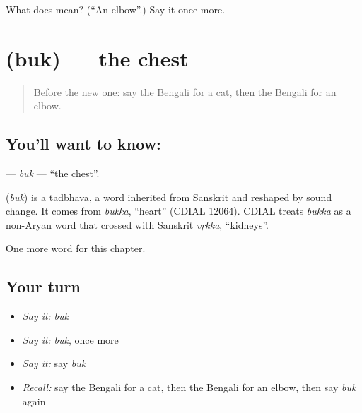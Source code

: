 \begin{tcolorbox}[breakable,colback=teal!4,colframe=teal!35!black,title={Before you move on}]
What does  mean? (\textquotedblleft{}An elbow\textquotedblright{}.) Say it once more.
\end{tcolorbox}
\section[\texorpdfstring{\bn{বুক} (buk)}{বুক (buk)}]{ (buk) — the chest}

\label{lesson:BN-C123-buk}



\begin{quote}
Before the new one: say the Bengali for a cat, then the Bengali for an elbow.
\end{quote}

\subsection*{You'll want to know: }
\textbf{} — \emph{buk} — \textquotedblleft{}the chest\textquotedblright{}.

\begin{cousinweb}
\textbf{} (\emph{buk}) is a tadbhava, a word inherited from Sanskrit and reshaped by sound change. It comes from \emph{bukka}, \textquotedblleft{}heart\textquotedblright{} (CDIAL 12064). CDIAL treats \emph{bukka} as a non-Aryan word that crossed with Sanskrit \emph{vṛkka}, \textquotedblleft{}kidneys\textquotedblright{}.
\end{cousinweb}

\begin{grammarlens}[title={What you've built}]
One more word for this chapter.
\end{grammarlens}

\subsection*{Your turn}
\begin{itemize}
\raggedright
  \item \emph{Say it:} \emph{buk}
  \item \emph{Say it:} \emph{buk}, once more
  \item \emph{Say it:} say \emph{buk}
  \item \emph{Recall:} say the Bengali for a cat, then the Bengali for an elbow, then say \emph{buk} again
\end{itemize}

